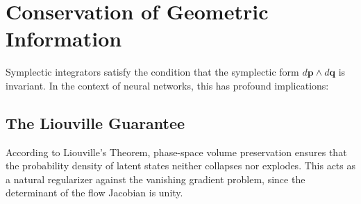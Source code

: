 \documentclass[12pt,a4paper]{article}
\begin{document}
\section{Conservation of Geometric Information}

Symplectic integrators satisfy the condition that the symplectic form $d\mathbf{p} \wedge d\mathbf{q}$ is invariant. In the context of neural networks, this has profound implications:

\subsection{The Liouville Guarantee}

According to Liouville's Theorem, phase-space volume preservation ensures that the probability density of latent states neither collapses nor explodes. This acts as a natural regularizer against the vanishing gradient problem, since the determinant of the flow Jacobian is unity.
\end{document}
